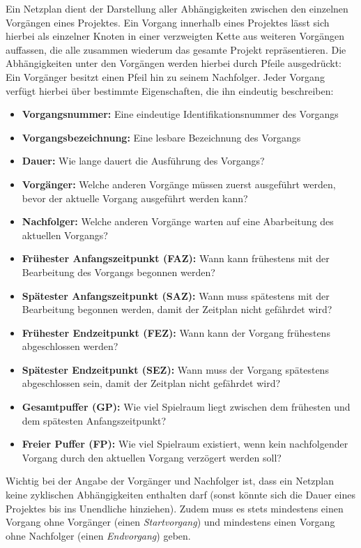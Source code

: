 Ein Netzplan dient der Darstellung aller Abh\"angigkeiten zwischen den
einzelnen Vorg\"angen eines Projektes. Ein Vorgang innerhalb eines
Projektes l\"asst sich hierbei als einzelner Knoten in einer
verzweigten Kette aus weiteren Vorg\"angen auffassen, die alle
zusammen wiederum das gesamte Projekt repr\"asentieren. Die
Abh\"angigkeiten unter den Vorg\"angen werden hierbei durch Pfeile
ausgedr\"uckt: Ein Vorg\"anger besitzt einen Pfeil hin zu seinem
Nachfolger. Jeder Vorgang verf\"ugt hierbei \"uber bestimmte
Eigenschaften, die ihn eindeutig beschreiben:
\begin{itemize}
  \item \textbf{Vorgangsnummer:} Eine eindeutige Identifikationsnummer
    des Vorgangs
  \item \textbf{Vorgangsbezeichnung:} Eine lesbare Bezeichnung des Vorgangs
  \item \textbf{Dauer:} Wie lange dauert die Ausf\"uhrung des
    Vorgangs?
  \item \textbf{Vorg\"anger:} Welche anderen Vorg\"ange m\"ussen
    zuerst ausgef\"uhrt werden, bevor der aktuelle Vorgang
    ausgef\"uhrt werden kann?
  \item \textbf{Nachfolger:} Welche anderen Vorg\"ange warten auf eine
    Abarbeitung des aktuellen Vorgangs?
  \item \textbf{Fr\"uhester Anfangszeitpunkt (FAZ):} Wann kann
    fr\"uhestens mit der Bearbeitung des Vorgangs begonnen werden?
  \item \textbf{Sp\"atester Anfangszeitpunkt (SAZ):} Wann muss
    sp\"atestens mit der Bearbeitung begonnen werden, damit der
    Zeitplan nicht gef\"ahrdet wird?
  \item \textbf{Fr\"uhester Endzeitpunkt (FEZ):} Wann kann der Vorgang
    fr\"uhestens abgeschlossen werden?
  \item \textbf{Sp\"atester Endzeitpunkt (SEZ):} Wann muss der Vorgang
    sp\"atestens abgeschlossen sein, damit der Zeitplan nicht
    gef\"ahrdet wird?
  \item \textbf{Gesamtpuffer (GP):} Wie viel Spielraum liegt zwischen
    dem fr\"uhesten und dem sp\"atesten Anfangszeitpunkt?
  \item \textbf{Freier Puffer (FP):} Wie viel Spielraum existiert,
    wenn kein nachfolgender Vorgang durch den aktuellen Vorgang
    verz\"ogert werden soll?
\end{itemize}
Wichtig bei der Angabe der Vorg\"anger und Nachfolger ist, dass ein
Netzplan keine zyklischen Abh\"angigkeiten enthalten darf (sonst
k\"onnte sich die Dauer eines Projektes bis ins Unendliche hinziehen).
Zudem muss es stets mindestens einen Vorgang ohne Vorg\"anger (einen
\textit{Startvorgang}) und mindestens einen Vorgang ohne Nachfolger
(einen \textit{Endvorgang}) geben.

